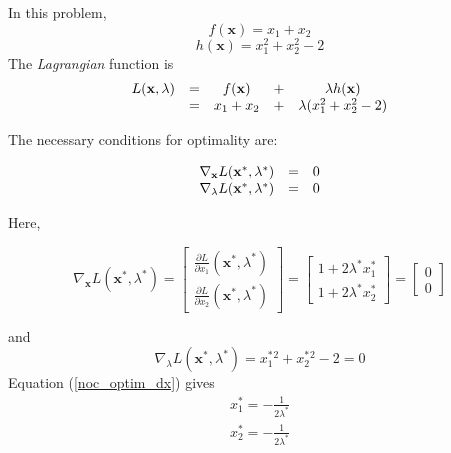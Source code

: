 ﻿\documentclass[twoside]{article}
\begin{document}
In this problem,
\[ f(\mathbf{x}) = x_1 + x_2 \]
\[ h(\mathbf{x}) = x_1^2 + x_2^2 - 2 \]
The \textit{Lagrangian }function is
\begin{equation}
\begin{array}{c c c c c}
 L(\mathbf{x}, \lambda) & =&  f(\mathbf{x}) & +& \lambda h(\mathbf{x}) \\
  & =& x_1 + x_2 & + & \lambda(x_1^2 + x_2^2 - 2)
\end{array}
\end{equation}


The necessary conditions for optimality are: 

\begin{equation} \label{noc_optim1}
\begin{array}{c c c}
\nabla_\mathbf{x} L(\mathbf{x}^*,\lambda^*) &=& 0 \\
\nabla_\lambda L(\mathbf{x}^*,\lambda^*) &=& 0 \\
\end{array}
\end{equation}

Here, 

\begin{equation} \label{noc_optim_dx}
\nabla_\mathbf{x} L(\mathbf{x}^*,\lambda^*) = 
\begin{bmatrix}
    \frac{\partial L}{\partial x_1}(\mathbf{x}^*,\lambda^*) \\
    \frac{\partial L}{\partial x_2}(\mathbf{x}^*,\lambda^*) 
\end{bmatrix}
=
\begin{bmatrix}
    1 + 2 \lambda^* x_1^* \\
    1 + 2 \lambda^* x_2^*
\end{bmatrix}
= 
\begin{bmatrix}
    0 \\
    0
\end{bmatrix}
\end{equation}

and 
\begin{equation} \label{noc_optim_dlambda}
\nabla_\lambda L(\mathbf{x}^*,\lambda^*) = 
x_1^*^2 + x_2^*^2 - 2 = 0
\end{equation}
Equation (\ref{noc_optim_dx}) gives 
\begin{equation} \label{ex_sol_part1}
    \begin{array}{c}
        x_1^* = - \frac{1}{2 \lambda^*} \\
        x_2^* = - \frac{1}{2 \lambda^*}
    \end{array}
\end{equation}
\end{document}
